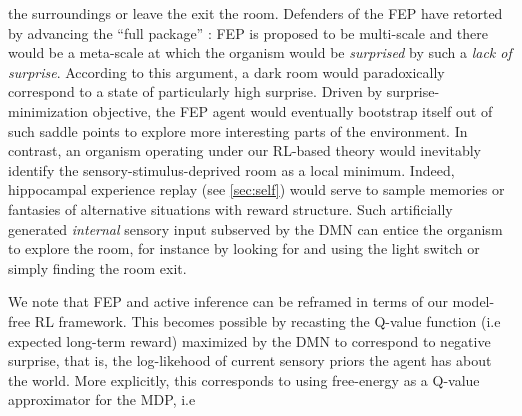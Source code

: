 \documentclass[10pt,letterpaper]{article}
\begin{document}
the surroundings or leave the exit the room.
Defenders of the FEP have retorted by advancing the ``full package'' \citep{darkroom2012}:
FEP is proposed to be multi-scale and there would be a meta-scale at which the organism would
be \textit{surprised} by such a \textit{lack of surprise}. According to this argument, a dark room would paradoxically correspond to a state of particularly high surprise.
Driven by surprise-minimization objective, the FEP agent would eventually bootstrap itself out of such saddle points to explore more interesting parts of the environment.
In contrast, an organism operating under our RL-based theory would inevitably
identify the sensory-stimulus-deprived room as a local minimum. Indeed, hippocampal experience replay (see \ref{sec:self}) would serve to sample memories or fantasies of alternative situations
with reward structure. Such artificially generated \textit{internal} sensory input
subserved by the DMN can entice the organism to explore the room,
for instance by looking for and using the light switch or simply finding the room exit.

We note that FEP and active inference can be reframed in terms of
our model-free RL framework.
This becomes possible by recasting the Q-value function (i.e expected long-term reward) maximized by the DMN to
correspond to negative surprise,
that is, the log-likehood of current sensory priors
the agent has about the world. More explicitly, this corresponds to using free-energy as a Q-value approximator for the MDP, i.e
\end{document}
